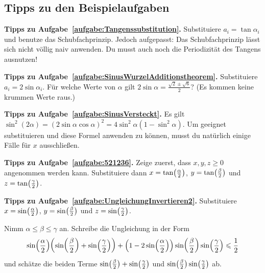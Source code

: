 \subsection*{Tipps zu den Beispielaufgaben}

\textbf{Tipps zu Aufgabe~\ref{aufgabe:Tangenssubstitution}.} Substituiere $a_i=\tan \alpha_i$ und benutze das Schubfachprinzip. Jedoch aufgepasst: Das Schubfachprinzip lässt sich nicht völlig naiv anwenden. Du musst auch noch die Periodizität des Tangens ausnutzen!

\textbf{Tipps zu Aufgabe~\ref{aufgabe:SinusWurzelAdditionstheorem}.} Substituiere $a_i=2\sin\alpha_i$. Für welche Werte von $\alpha$ gilt $2\sin\alpha = \frac{\sqrt{2}\pm\sqrt{6}}{2}$? (Es kommen keine krummen Werte raus.)

\textbf{Tipps zu Aufgabe~\ref{aufgabe:SinusVersteckt}.} Es gilt $\sin^2(2\alpha)=(2\sin\alpha\cos\alpha)^2=4\sin^2\alpha(1-\sin^2\alpha)$. Um geeignet substituieren und diese Formel anwenden zu können, musst du natürlich einige Fälle für $x$ ausschließen.

\textbf{Tipps zu Aufgabe~\ref{aufgabe:521236}.} Zeige zuerst, dass $x,y,z\geqslant 0$ angenommen werden kann. Substituiere dann $x=\tan\parens[\big]{\frac{\alpha}2}$, $y=\tan\parens[\big]{\frac{\beta}2}$ und $z=\tan\parens[\big]{\frac{\gamma}2}$.

\textbf{Tipps zu Aufgabe~\ref{aufgabe:UngleichungInvertieren2}.} Substituiere $x=\sin\parens[\big]{\frac{\alpha}2}$, $y=\sin\parens[\big]{\frac{\beta}2}$ und $z=\sin\parens[\big]{\frac{\gamma}2}$.

Nimm $\alpha\leqslant \beta\leqslant \gamma$ an. Schreibe die Ungleichung in der Form
\begin{equation*}
	\sin\parens*{\frac{\alpha}2}\parens*{\sin\parens*{\frac{\beta}2}+\sin\parens*{\frac{\gamma}2}}+\parens*{1-2\sin\parens*{\frac{\alpha}2}}\sin\parens*{\frac{\beta}2}\sin\parens*{\frac{\gamma}2}\leqslant \frac12
\end{equation*}
und schätze die beiden Terme $\sin\parens[\big]{\frac{\beta}2}+\sin\parens[\big]{\frac{\gamma}2}$ und $\sin\parens[\big]{\frac{\beta}2}\sin\parens[\big]{\frac{\gamma}2}$ ab.